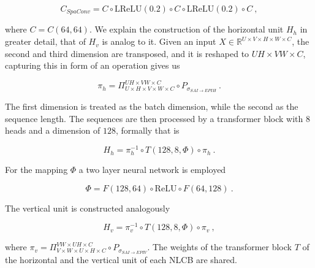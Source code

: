    $$ C_{SpaConv} = C \circ \text{LReLU}(0.2) \circ C \circ \text{LReLU}(0.2) \circ C ~,$$

where $C = C(64, 64)$.
We explain the construction of the horizontal unit $H_h$ in greater detail,
that of $H_v$ is analog to it.
Given an input $X \in \mathbb R^{U \times V \times H \times W \times C}$,
the second and third dimension are transposed, 
and it is reshaped to $UH \times VW \times C$,
capturing this in form of an operation gives us

    $$\pi_h = \Pi_{U \times H \times V \times W \times C}^{UH \times VW \times C} \circ P_{\sigma_{SAI \to EPIH}} ~.$$

The first dimension is treated as the batch dimension, 
while the second as the sequence length.
The sequences are then processed by a transformer block with $8$ heads and a dimension of $128$,
formally that is

    $$ H_{h} =  \pi_h^{-1} \circ T(128, 8, \Phi) \circ \pi_h ~.$$

For the mapping $\Phi$ a two layer neural network is employed

    $$ \Phi = F(128, 64) \circ \text{ReLU} \circ F(64, 128) ~.$$

The vertical unit is constructed analogously

    $$ H_v = \pi_v^{-1} \circ T(128, 8, \Phi) \circ \pi_v ~, $$

where $\pi_v = \Pi_{V \times W \times U \times H \times C}^{VW \times UH \times C} \circ P_{\sigma_{SAI \to EPIV}}$.
The weights of the transformer block $T$ of the horizontal and the vertical unit of each NLCB are shared.

